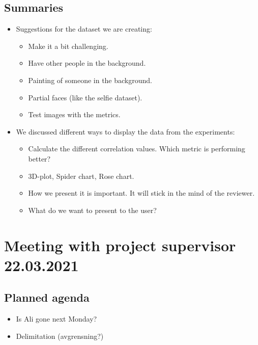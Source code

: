 \subsection*{Summaries}
\begin{itemize}
    \item Suggestions for the dataset we are creating:
    \begin{itemize}
        \item Make it a bit challenging. 
        \item Have other people in the background. 
        \item Painting of someone in the background.
        \item Partial faces (like the selfie dataset).
        \item Test images with the metrics.
    \end{itemize}
    \item We discussed different ways to display the data from the experiments:
    \begin{itemize}
        \item Calculate the different correlation values. Which metric is performing better?
        \item 3D-plot, Spider chart, Rose chart.
        \item How we present it is important. It will stick in the mind of the reviewer. 
        \item What do we want to present to the user?
    \end{itemize}
\end{itemize}



\section*{Meeting with project supervisor 22.03.2021}
\subsection*{Planned agenda}
\begin{itemize}
    \item Is Ali gone next Monday?
    \item Delimitation (avgrensning?)
\end{itemize}


